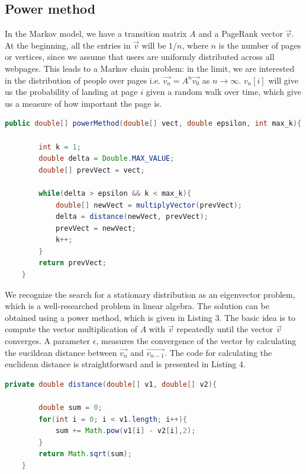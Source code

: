 \documentclass[9.5pt]{extarticle}
\begin{document}
\subsection{Power method}

In the Markov model, we have a transition matrix $A$ and a PageRank vector $\vec{v}$. At the beginning, all the entries in $\vec{v}$ will be $1/n$, where $n$ is the number of pages or vertices, since we assume that users are uniformly distributed across all webpages. This leads to a Markov chain problem: in the limit, we are interested in the distribution of people over pages i.e. $\vec{v_n} = A^n\vec{v_0}$ as $n \to \infty$. $v_n[i]$ will give us the probability of landing at page $i$ given a random walk over time, which give us a measure of how important the page is. 

\begin{lstlisting}[language=java,caption={powerMethod}]
    public double[] powerMethod(double[] vect, double epsilon, int max_k){

        int k = 1;
        double delta = Double.MAX_VALUE;
        double[] prevVect = vect;

        while(delta > epsilon && k < max_k){
            double[] newVect = multiplyVector(prevVect);
            delta = distance(newVect, prevVect);
            prevVect = newVect;
            k++;
        }
        return prevVect;
    }
\end{lstlisting}

We recognize the search for a stationary distribution as an eigenvector problem, which is a well-researched problem in linear algebra. The solution can be obtained using a power method, which is given in Listing 3. The basic idea is to compute the vector multiplication of $A$ with $\vec{v}$ repeatedly until the vector $\vec{v}$ converges. A parameter $\epsilon$, measures the convergence of the vector by calculating the eucildean distance between $\vec{v_n}$ and $\vec{v_{n-1}}$. The code for calculating the euclidean distance is straightforward and is presented in Listing 4.


\begin{lstlisting}[language=java,caption={distance}]
    private double distance(double[] v1, double[] v2){

        double sum = 0;
        for(int i = 0; i < v1.length; i++){
            sum += Math.pow(v1[i] - v2[i],2);
        }
        return Math.sqrt(sum);
    }
\end{lstlisting}
\end{document}
